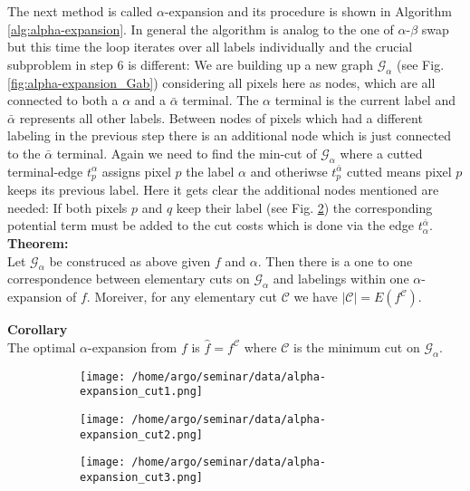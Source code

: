 \documentclass{scrartcl}[12pt, halfparskip]
\begin{document}
The next method is called $\alpha$-expansion and its procedure is shown in Algorithm \ref{alg:alpha-expansion}. In general the algorithm is analog to the one of $\alpha$-$\beta$ swap but this time the loop iterates over all labels individually and the crucial subproblem in step 6 is different:
We are building up a new graph $\mathcal{G}_\alpha$ (see Fig. \ref{fig:alpha-expansion_Gab}) considering all pixels here as nodes, which are all connected to both a $\alpha$ and a $\bar{\alpha}$ terminal. 
The $\alpha$ terminal is the current label and $\bar{\alpha}$ represents all other labels. 
Between nodes of pixels which had a different labeling in the previous step there is an additional node which is just connected to the $\bar{\alpha}$ terminal. 
Again we need to find the min-cut of $\mathcal{G}_\alpha$ where a cutted terminal-edge $t_p^\alpha$ assigns pixel $p$ the label $\alpha$ and otheriwse $t_p^{\bar{\alpha}}$ cutted means pixel $p$ keeps its previous label. Here it gets clear the additional nodes mentioned are needed: If both pixels $p$ and $q$ keep their label (see Fig. \ref{fig:alpha-expansion_Gab_cut2}) the corresponding potential term must be added to the cut costs which is done via the edge $t_\alpha^{\bar{\alpha}}$. \\



\textbf{Theorem:} \\
Let $\mathcal{G}_\alpha$ be construced as above given $f$ and $\alpha$. Then there is a one to one correspondence between elementary cuts on $\mathcal{G}_\alpha$ and labelings within one $\alpha$-expansion of $f$. Moreiver, for any elementary cut $\mathcal{C}$ we have $|\mathcal{C}| = E(f^\mathcal{C})$.

\textbf{Corollary} \\
The optimal $\alpha$-expansion from $f$ is $\hat{f} = f^\mathcal{C}$ where $\mathcal{C}$ is the minimum cut on $\mathcal{G}_\alpha$.


\begin{figure}[H]
	\begin{subfigure}{0.32\textwidth}
		\centering
		\texttt{[image: /home/argo/seminar/data/alpha-expansion\_cut1.png]}
		\caption{}
		\label{fig:alpha-expansion_Gab_cut1}
	\end{subfigure}
	\begin{subfigure}{0.32\textwidth}
		\centering
		\texttt{[image: /home/argo/seminar/data/alpha-expansion\_cut2.png]}
		\caption{}
		\label{fig:alpha-expansion_Gab_cut2}
	\end{subfigure}
	\begin{subfigure}{0.32\textwidth}
		\centering
		\texttt{[image: /home/argo/seminar/data/alpha-expansion\_cut3.png]}
		\caption{}
		\label{fig:alpha-expansion_Gab_cut3}
	\end{subfigure}
\label{fig:alpha-expansion_Gab_cuts}
\caption{}
\end{figure}
\end{document}
